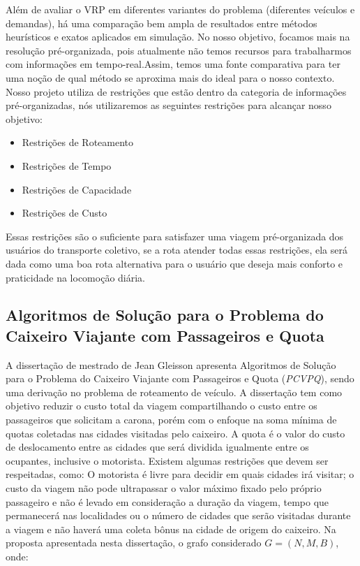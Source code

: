  Além de avaliar o VRP em diferentes variantes do problema (diferentes veículos e demandas), há uma comparação bem ampla de resultados entre métodos heurísticos e exatos aplicados em simulação. No nosso objetivo, focamos mais na resolução pré-organizada, pois atualmente não temos recursos para trabalharmos com informações em tempo-real.Assim, temos uma fonte comparativa para ter uma noção de qual método se aproxima mais do ideal para o nosso contexto. Nosso projeto utiliza de restrições que estão dentro da categoria de informações pré-organizadas, nós utilizaremos as seguintes restrições para alcançar nosso objetivo:
 
\begin{itemize}
\item Restrições de Roteamento
\item Restrições de Tempo
\item Restrições de Capacidade
\item Restrições de Custo
\end{itemize}

Essas restrições são o suficiente para satisfazer uma viagem pré-organizada dos usuários do transporte coletivo, se a rota atender todas essas restrições, ela será dada como uma boa rota alternativa para o usuário que deseja mais conforto e praticidade na locomoção diária.
 
 \subsection{Algoritmos de Solução para o Problema do Caixeiro Viajante com Passageiros e Quota}
 
 A dissertação de mestrado de Jean Gleisson apresenta Algoritmos de Solução para o Problema do Caixeiro Viajante com Passageiros e Quota (\emph{PCVPQ}), sendo uma derivação no problema de roteamento de veículo. A dissertação tem como objetivo reduzir o custo total da viagem compartilhando o custo entre os passageiros que solicitam a carona, porém com o enfoque na soma mínima de quotas coletadas nas cidades visitadas pelo caixeiro. A quota é o valor do custo de deslocamento entre as cidades que será dividida igualmente entre os ocupantes, inclusive o motorista.
Existem algumas restrições que devem ser respeitadas, como: O motorista é livre para decidir em quais cidades irá visitar; o custo da viagem não pode ultrapassar o valor máximo fixado pelo próprio passageiro e não é levado em consideração a duração da viagem, tempo que permanecerá nas localidades ou o número de cidades que serão visitadas durante a viagem e não haverá uma coleta bônus na cidade de origem do caixeiro.
Na proposta apresentada nesta dissertação, o grafo considerado $G = (N, M, B)$, onde:

